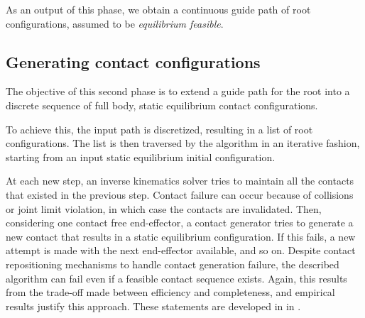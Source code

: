 As an output of this phase, we obtain a continuous guide path of root configurations, assumed to be \textit{equilibrium feasible}.

\subsection{Generating contact configurations}
\label{sec:steve_contact}
The objective of this second phase is to extend a guide path for the root into a discrete sequence of full body, static equilibrium
contact configurations.

To achieve this, the input path is discretized, resulting in a list of root configurations.
The list is then traversed by the algorithm in an iterative fashion, starting from an input static equilibrium 
initial configuration. 

At each new step, an inverse kinematics solver tries to maintain all the contacts that existed in the previous step.
Contact failure can occur because of collisions or joint limit violation, in which case the contacts are invalidated.
Then, considering one contact free end-effector, a contact generator tries to generate a new contact that results in 
a static equilibrium configuration. If this fails, a new attempt is made with the next end-effector available, and so on.
Despite contact repositioning mechanisms to handle contact generation failure, the described algorithm can fail 
even if a feasible contact sequence exists. Again, this results from the trade-off made between efficiency and completeness, and empirical
results justify this approach. These statements are developed in in \cite{tonneauijrr16}.

